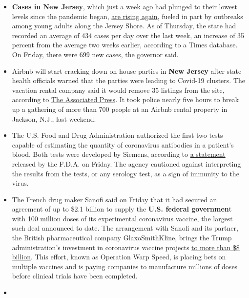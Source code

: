 \begin{itemize}
\item
  \textbf{Cases in New Jersey}, which just a week ago had plunged to
  their lowest levels since the pandemic began,
  \href{https://www.nytimes3xbfgragh.onion/2020/07/30/nyregion/coronavirus-cases-nj.html}{are
  rising again}, fueled in part by outbreaks among young adults along
  the Jersey Shore. As of Thursday, the state had recorded an average of
  434 cases per day over the last week, an increase of 35 percent from
  the average two weeks earlier, according to a Times database. On
  Friday, there were 699 new cases, the governor said.
\item
  Airbnb will start cracking down on house parties in \textbf{New
  Jersey} after state health officials warned that the parties were
  leading to Covid-19 clusters. The vacation rental company said it
  would remove 35 listings from the site, according to
  \href{https://apnews.com/c64053bb7f7b60001a314526da06732e}{The
  Associated Press}. It took police nearly five hours to break up a
  gathering of more than 700 people at an Airbnb rental property in
  Jackson, N.J., last weekend.
\item
  The U.S. Food and Drug Administration authorized the first two tests
  capable of estimating the quantity of coronavirus antibodies in a
  patient's blood. Both tests were developed by Siemens, according to
  \href{https://www.fda.gov/news-events/press-announcements/coronavirus-covid-19-update-fda-authorizes-first-tests-estimate-patients-antibodies-past-sars-cov-2}{a
  statement} released by the F.D.A. on Friday. The agency cautioned
  against interpreting the results from the tests, or any serology test,
  as a sign of immunity to the virus.
\item
  The French drug maker Sanofi said on Friday that it had secured an
  agreement of up to \$2.1 billion to supply the \textbf{U.S. federal
  governmen}t with 100 million doses of its experimental coronavirus
  vaccine, the largest such deal announced to date. The arrangement with
  Sanofi and its partner, the British pharmaceutical company
  GlaxoSmithKline, brings the Trump administration's investment in
  coronavirus vaccine projects
  \href{https://medicalcountermeasures.gov/app/barda/coronavirus/COVID19.aspx?filter=vaccine}{to
  more than \$8 billion}. This effort, known as Operation Warp Speed, is
  placing bets on multiple vaccines and is paying companies to
  manufacture millions of doses before clinical trials have been
  completed.
\item

\end{itemize}
